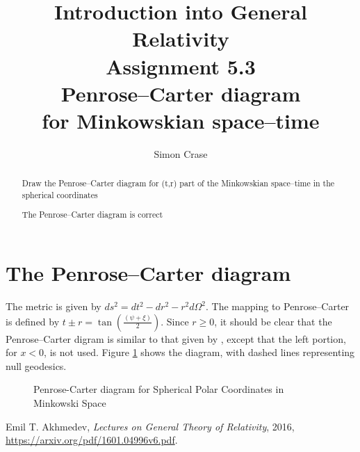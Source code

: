 \documentclass[]{article}
\title{Introduction into General Relativity\\Assignment 5.3\\Penrose--Carter diagram\\ for Minkowskian space--time}
\author{Simon Crase}
\begin{document}
\maketitle

\begin{abstract}
Draw the Penrose--Carter diagram for (t,r) part of the Minkowskian space--time in the spherical coordinates

The Penrose--Carter diagram is correct

\end{abstract}

\section{The Penrose--Carter diagram}

The metric is given by $ds^2=dt^2-dr^2-r^2d\Omega^2$.  The mapping to Penrose--Carter is defined by $t\pm r=\tan(\frac{(\psi+\xi)}{2})$. Since $r\ge 0$, it should be clear that the Penrose--Carter digram is similar to that given by \cite[V, Figure 9]{akhmedev2016}, except that the left portion, for $x<0$, is not used. Figure \ref{fig:pc} shows the diagram, with dashed lines representing null geodesics.


\begin{figure}[H]
		\caption{Penrose-Carter diagram for Spherical Polar Coordinates in Minkowski Space}
	\label{fig:pc}
\end{figure}


\begin{thebibliography}{9}
	
	Emil T. Akhmedev,
	\emph{Lectures on General Theory of Relativity},
	2016,
	\url{https://arxiv.org/pdf/1601.04996v6.pdf}.
	
\end{thebibliography}
\end{document}
